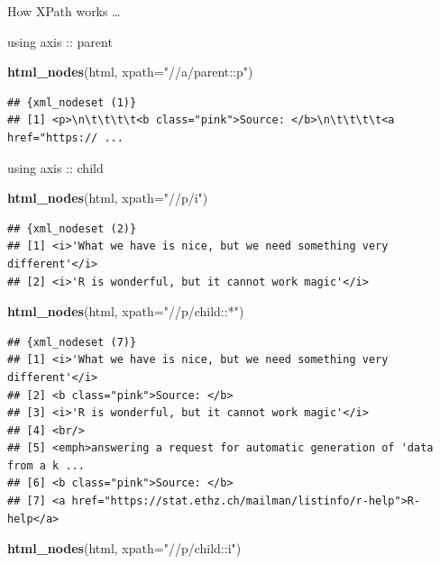 \documentclass[ignorenonframetext,]{beamer}
\newenvironment{Shaded}{\begin{snugshade}}{\end{snugshade}}
\newcommand{\KeywordTok}[1]{\textcolor[rgb]{0.13,0.29,0.53}{\textbf{{#1}}}}
\newcommand{\DataTypeTok}[1]{\textcolor[rgb]{0.13,0.29,0.53}{{#1}}}
\newcommand{\StringTok}[1]{\textcolor[rgb]{0.31,0.60,0.02}{{#1}}}
\newcommand{\NormalTok}[1]{{#1}}
\begin{document}
\begin{frame}[fragile]{How XPath works \ldots{}}
\begin{block}{using axis :: parent}
\begin{Shaded}
\begin{Highlighting}[]
\KeywordTok{html_nodes}\NormalTok{(html, }\DataTypeTok{xpath=}\StringTok{"//a/parent::p"}\NormalTok{)}
\end{Highlighting}
\end{Shaded}

\begin{verbatim}
## {xml_nodeset (1)}
## [1] <p>\n\t\t\t\t<b class="pink">Source: </b>\n\t\t\t\t<a href="https:// ...
\end{verbatim}

\end{block}

\begin{block}{using axis :: child}

\begin{Shaded}
\begin{Highlighting}[]
\KeywordTok{html_nodes}\NormalTok{(html, }\DataTypeTok{xpath=}\StringTok{"//p/i"}\NormalTok{)}
\end{Highlighting}
\end{Shaded}

\begin{verbatim}
## {xml_nodeset (2)}
## [1] <i>'What we have is nice, but we need something very different'</i>
## [2] <i>'R is wonderful, but it cannot work magic'</i>
\end{verbatim}

\begin{Shaded}
\begin{Highlighting}[]
\KeywordTok{html_nodes}\NormalTok{(html, }\DataTypeTok{xpath=}\StringTok{"//p/child::*"}\NormalTok{)}
\end{Highlighting}
\end{Shaded}

\begin{verbatim}
## {xml_nodeset (7)}
## [1] <i>'What we have is nice, but we need something very different'</i>
## [2] <b class="pink">Source: </b>
## [3] <i>'R is wonderful, but it cannot work magic'</i>
## [4] <br/>
## [5] <emph>answering a request for automatic generation of 'data from a k ...
## [6] <b class="pink">Source: </b>
## [7] <a href="https://stat.ethz.ch/mailman/listinfo/r-help">R-help</a>
\end{verbatim}

\begin{Shaded}
\begin{Highlighting}[]
\KeywordTok{html_nodes}\NormalTok{(html, }\DataTypeTok{xpath=}\StringTok{"//p/child::i"}\NormalTok{)}
\end{Highlighting}
\end{Shaded}


\end{block}
\end{frame}
\end{document}
